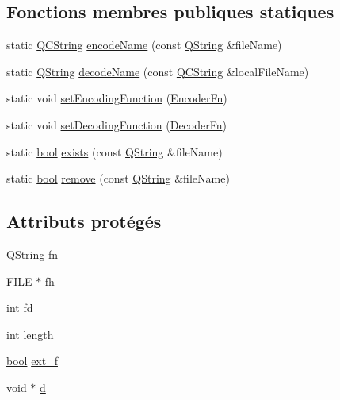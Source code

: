 \subsection*{Fonctions membres publiques statiques}
\begin{DoxyCompactItemize}
\item 
static \hyperlink{class_q_c_string}{Q\+C\+String} \hyperlink{class_q_file_ad016ade1aca4b965ebb54d8bfb93d4bf}{encode\+Name} (const \hyperlink{class_q_string}{Q\+String} \&file\+Name)
\item 
static \hyperlink{class_q_string}{Q\+String} \hyperlink{class_q_file_ad9bf876589a366445a443cb8c7ef4df4}{decode\+Name} (const \hyperlink{class_q_c_string}{Q\+C\+String} \&local\+File\+Name)
\item 
static void \hyperlink{class_q_file_a634585187a63a52cc02d7c4578492666}{set\+Encoding\+Function} (\hyperlink{class_q_file_abc28a2af8ddad44c42b316e9f15af9c2}{Encoder\+Fn})
\item 
static void \hyperlink{class_q_file_aa71ab03f9a14cc35fe1e70dd9a392806}{set\+Decoding\+Function} (\hyperlink{class_q_file_a79dc4d72e10f49d4430b299ebc34ec9e}{Decoder\+Fn})
\item 
static \hyperlink{qglobal_8h_a1062901a7428fdd9c7f180f5e01ea056}{bool} \hyperlink{class_q_file_a11a21bf641a2bda6fd2f992881f73f72}{exists} (const \hyperlink{class_q_string}{Q\+String} \&file\+Name)
\item 
static \hyperlink{qglobal_8h_a1062901a7428fdd9c7f180f5e01ea056}{bool} \hyperlink{class_q_file_aab5e02ed6b84c93b140ec6b346d41ff6}{remove} (const \hyperlink{class_q_string}{Q\+String} \&file\+Name)
\end{DoxyCompactItemize}
\subsection*{Attributs protégés}
\begin{DoxyCompactItemize}
\item 
\hyperlink{class_q_string}{Q\+String} \hyperlink{class_q_file_ae088d4677b272210ec510c55454930a4}{fn}
\item 
F\+I\+L\+E $\ast$ \hyperlink{class_q_file_a1ff87fa1a08ce3d4d8ae87252f4be11a}{fh}
\item 
int \hyperlink{class_q_file_a69672951d3fc9e9a61f51e93eab34fc9}{fd}
\item 
int \hyperlink{class_q_file_add1ff97139b091dcca4f3958c3dbd484}{length}
\item 
\hyperlink{qglobal_8h_a1062901a7428fdd9c7f180f5e01ea056}{bool} \hyperlink{class_q_file_ab437c510371962db31e7184e913b3cad}{ext\+\_\+f}
\item 
void $\ast$ \hyperlink{class_q_file_aa1970afffb4d3157497d2e5556dc2228}{d}
\end{DoxyCompactItemize}
